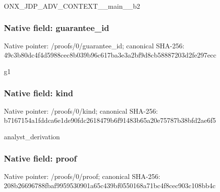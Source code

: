 \documentclass[10pt,a4paper]{article}
\begin{document}
\begingroup\raggedright\sloppy ONX\_\allowbreak{}JDP\_\allowbreak{}ADV\_\allowbreak{}CONTEXT\_\allowbreak{}\_\allowbreak{}main\_\allowbreak{}\_\allowbreak{}b2\par\endgroup

\subsubsection{Native field: guarantee\_\allowbreak{}id}
Native pointer: /proofs/0/guarantee\_\allowbreak{}id; canonical SHA-256: 49c3b80dc4f4d5988cec8b039b96c617ba3e3a2bf9d8cb58887203d2fe297ecc

\begingroup\raggedright\sloppy g1\par\endgroup

\subsubsection{Native field: kind}
Native pointer: /proofs/0/kind; canonical SHA-256: b7167154a1fddca6e1de90fdc2618479b6f91483b65a20e75787b38bfd2ae6f5

\begingroup\raggedright\sloppy analyst\_\allowbreak{}derivation\par\endgroup

\subsubsection{Native field: proof}
Native pointer: /proofs/0/proof; canonical SHA-256: 208b26696788fbaf9959530901a65c439bf0550168a71bc4f8cec903c108bb4c
\end{document}
